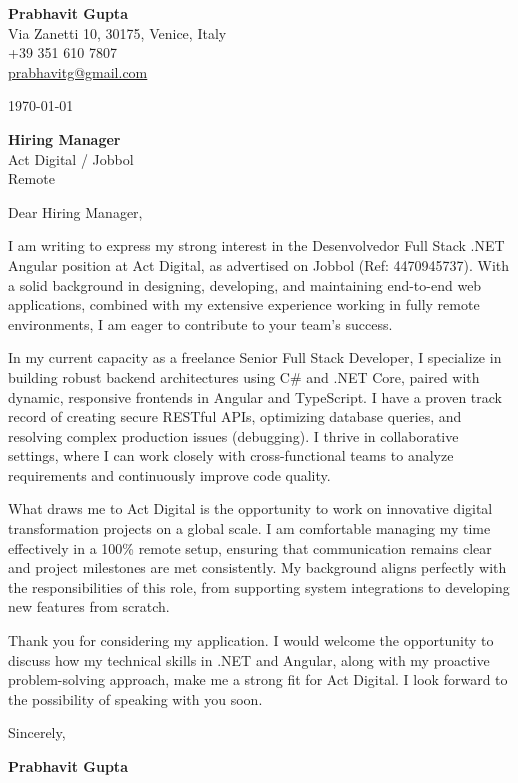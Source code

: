 \documentclass[11pt,a4paper]{article}
\begin{document}
\begin{flushleft}
\textbf{Prabhavit Gupta} \\
Via Zanetti 10, 30175, Venice, Italy \\
+39 351 610 7807 \\
\href{mailto:prabhavitg@gmail.com}{prabhavitg@gmail.com}
\end{flushleft}

\vspace{5mm}
\begin{flushright}
\today
\end{flushright}

\vspace{5mm}
\begin{flushleft}
\textbf{Hiring Manager} \\
Act Digital / Jobbol \\
Remote
\end{flushleft}

\vspace{5mm}
\noindent Dear Hiring Manager,

\vspace{3mm}
\noindent I am writing to express my strong interest in the Desenvolvedor Full Stack .NET Angular position at Act Digital, as advertised on Jobbol (Ref: 4470945737). With a solid background in designing, developing, and maintaining end-to-end web applications, combined with my extensive experience working in fully remote environments, I am eager to contribute to your team's success.

\vspace{3mm}
\noindent In my current capacity as a freelance Senior Full Stack Developer, I specialize in building robust backend architectures using C\# and .NET Core, paired with dynamic, responsive frontends in Angular and TypeScript. I have a proven track record of creating secure RESTful APIs, optimizing database queries, and resolving complex production issues (debugging). I thrive in collaborative settings, where I can work closely with cross-functional teams to analyze requirements and continuously improve code quality.

\vspace{3mm}
\noindent What draws me to Act Digital is the opportunity to work on innovative digital transformation projects on a global scale. I am comfortable managing my time effectively in a 100\% remote setup, ensuring that communication remains clear and project milestones are met consistently. My background aligns perfectly with the responsibilities of this role, from supporting system integrations to developing new features from scratch.

\vspace{3mm}
\noindent Thank you for considering my application. I would welcome the opportunity to discuss how my technical skills in .NET and Angular, along with my proactive problem-solving approach, make me a strong fit for Act Digital. I look forward to the possibility of speaking with you soon.

\vspace{5mm}
\noindent Sincerely,

\vspace{5mm}
\noindent \textbf{Prabhavit Gupta}
\end{document}
